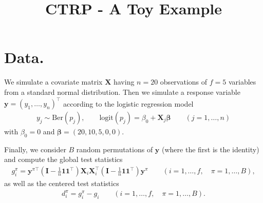 \documentclass[11pt,a4paper,openright,twoside]{article}
\title{CTRP - A Toy Example}
\author{}
\date{}
\begin{document}
\maketitle


\section{Data.} We simulate a covariate matrix $\mathbf{X}$ having $n=20$ observations of $f=5$ variables from a standard normal distribution. Then we simulate a response variable $\mathbf{y}=(y_1,\ldots,y_n)^\top$ according to the logistic regression model
\begin{align*}
y_j\sim\text{Ber}(p_j),\quad\quad\text{logit}(p_j)=\beta_0+\mathbf{X}_j\boldsymbol{\beta}\quad\quad(j=1,\ldots,n)
\end{align*}
with $\beta_0=0$ and $\mathbf{\beta}=(20,10,5,0,0)$.

Finally, we consider $B$ random permutations of $\mathbf{y}$ (where the first is the identity) and compute the global test statistics
\begin{align*}
g_i^\pi =\mathbf{y}^{\pi\top}\left(\mathbf{I}-\frac{1}{n}\mathbf{1}\mathbf{1}^\top\right)\mathbf{X}_i\mathbf{X}_i^\top\left(\mathbf{I}-\frac{1}{n}\mathbf{1}\mathbf{1}^\top\right)\mathbf{y}^{\pi} \quad\quad(i=1,\ldots,f,\quad \pi=1,\ldots,B),
\end{align*}
as well as the centered test statistics
\begin{align*}
d_i^\pi=g_i^\pi - g_i\quad\quad(i=1,\ldots,f,\quad \pi=1,\ldots,B).
\end{align*}
\end{document}
